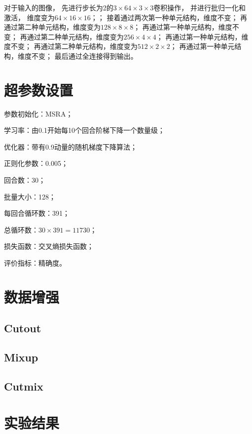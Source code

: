 \documentclass{article}
\begin{document}
对于输入的图像，
先进行步长为2的$3\times64\times3\times3$卷积操作，
并进行批归一化和激活，
维度变为$64\times16\times16$；；
接着通过两次第一种单元结构，维度不变；
再通过第二种单元结构，维度变为$128\times8\times8$；
再通过第一种单元结构，维度不变；
再通过第二种单元结构，维度变为$256\times4\times4$；
再通过第一种单元结构，维度不变；
再通过第二种单元结构，维度变为$512\times2\times2$；
再通过第一种单元结构，维度不变；
最后通过全连接得到输出。

\section{超参数设置}

参数初始化：MSRA；

学习率：由0.1开始每10个回合阶梯下降一个数量级；

优化器：带有0.9动量的随机梯度下降算法；

正则化参数：0.005；

回合数：30；

批量大小：128；

每回合循环数：391；

总循环数：$ 30 \times 391 = 11730 $；

损失函数：交叉熵损失函数；

评价指标：精确度。

\section{数据增强}

\subsection{Cutout}

\subsection{Mixup}

\subsection{Cutmix}

\section{实验结果}
\end{document}
